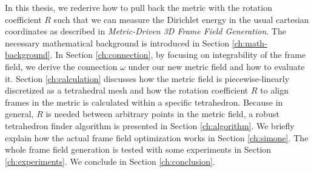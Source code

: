 \documentclass[../thesis.tex]{subfiles}
\begin{document}
In this thesis, we rederive how to pull back the metric with the rotation coefficient $R$ such that we can measure
the Dirichlet energy in the usual cartesian coordinates as described in \emph{Metric-Driven 3D Frame Field Generation}\cite{Fang23}.
The necessary mathematical background is introduced in Section \ref{ch:math-background}.
In Section \ref{ch:connection}, by focusing on integrability of the frame field,
we derive the connection $\omega$ under our new metric field and how to evaluate it.
Section \ref{ch:calculation} discusses how the metric field is piecewise-linearly discretized as a tetrahedral
mesh and how the rotation coefficient $R$ to align frames in the metric is calculated within a specific tetrahedron.
Because in general, $R$ is needed between arbitrary points in the metric field, a robust tetrahedron finder algorithm is
presented in Section \ref{ch:algorithm}.
We briefly explain how the actual frame field optimization works in Section \ref{ch:simone}.
The whole frame field generation is tested with some experiments in Section \ref{ch:experiments}.
We conclude in Section \ref{ch:conclusion}.
\end{document}
